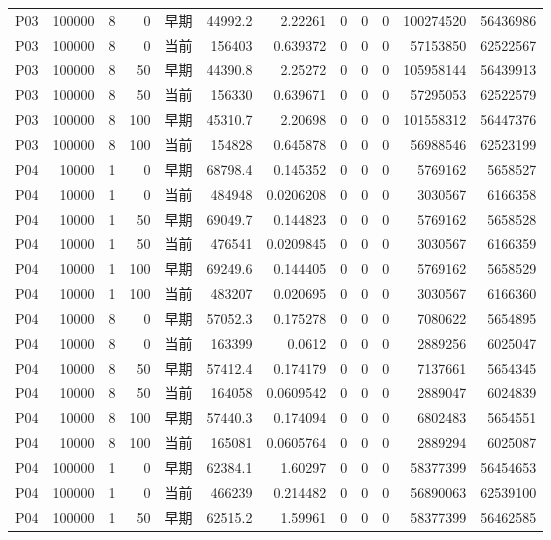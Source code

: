 \documentclass[UTF8,a4paper,10pt,twocolumn,fontset=fandol]{ctexart}
\begin{document}
\begin{longtable}{@{}lrrrlrrrrrrr@{}}
P03 & 100000 & 8 & 0 & 早期 & 44992.2 & 2.22261 & 0 & 0 & 0 & 100274520 & 56436986 \\
P03 & 100000 & 8 & 0 & 当前 & 156403 & 0.639372 & 0 & 0 & 0 & 57153850 & 62522567 \\
P03 & 100000 & 8 & 50 & 早期 & 44390.8 & 2.25272 & 0 & 0 & 0 & 105958144 & 56439913 \\
P03 & 100000 & 8 & 50 & 当前 & 156330 & 0.639671 & 0 & 0 & 0 & 57295053 & 62522579 \\
P03 & 100000 & 8 & 100 & 早期 & 45310.7 & 2.20698 & 0 & 0 & 0 & 101558312 & 56447376 \\
P03 & 100000 & 8 & 100 & 当前 & 154828 & 0.645878 & 0 & 0 & 0 & 56988546 & 62523199 \\
P04 & 10000 & 1 & 0 & 早期 & 68798.4 & 0.145352 & 0 & 0 & 0 & 5769162 & 5658527 \\
P04 & 10000 & 1 & 0 & 当前 & 484948 & 0.0206208 & 0 & 0 & 0 & 3030567 & 6166358 \\
P04 & 10000 & 1 & 50 & 早期 & 69049.7 & 0.144823 & 0 & 0 & 0 & 5769162 & 5658528 \\
P04 & 10000 & 1 & 50 & 当前 & 476541 & 0.0209845 & 0 & 0 & 0 & 3030567 & 6166359 \\
P04 & 10000 & 1 & 100 & 早期 & 69249.6 & 0.144405 & 0 & 0 & 0 & 5769162 & 5658529 \\
P04 & 10000 & 1 & 100 & 当前 & 483207 & 0.020695 & 0 & 0 & 0 & 3030567 & 6166360 \\
P04 & 10000 & 8 & 0 & 早期 & 57052.3 & 0.175278 & 0 & 0 & 0 & 7080622 & 5654895 \\
P04 & 10000 & 8 & 0 & 当前 & 163399 & 0.0612 & 0 & 0 & 0 & 2889256 & 6025047 \\
P04 & 10000 & 8 & 50 & 早期 & 57412.4 & 0.174179 & 0 & 0 & 0 & 7137661 & 5654345 \\
P04 & 10000 & 8 & 50 & 当前 & 164058 & 0.0609542 & 0 & 0 & 0 & 2889047 & 6024839 \\
P04 & 10000 & 8 & 100 & 早期 & 57440.3 & 0.174094 & 0 & 0 & 0 & 6802483 & 5654551 \\
P04 & 10000 & 8 & 100 & 当前 & 165081 & 0.0605764 & 0 & 0 & 0 & 2889294 & 6025087 \\
P04 & 100000 & 1 & 0 & 早期 & 62384.1 & 1.60297 & 0 & 0 & 0 & 58377399 & 56454653 \\
P04 & 100000 & 1 & 0 & 当前 & 466239 & 0.214482 & 0 & 0 & 0 & 56890063 & 62539100 \\
P04 & 100000 & 1 & 50 & 早期 & 62515.2 & 1.59961 & 0 & 0 & 0 & 58377399 & 56462585 \\

\end{longtable}
\end{document}
